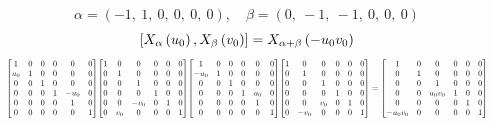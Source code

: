\documentclass[11pt]{article}
\theoremstyle{definition}
\begin{document}
\[
\alpha = \left( -1, \  1, \  0, \  0, \  0, \  0\right), \quad \beta = \left( 0, \  -1, \  -1, \  0, \  0, \  0\right)
\]
\[
\scaletoalign{\textwidth}{\left[ X_{\alpha}\left(u_{0}\right), X_{\beta}\left(v_{0}\right) \right] = X_{\alpha + \beta}\left(- u_{0} v_{0}\right)}
\]
\[
\scaletoalign{\textwidth}{{\left[\begin{matrix}1 & 0 & 0 & 0 & 0 & 0\\u_{0} & 1 & 0 & 0 & 0 & 0\\0 & 0 & 1 & 0 & 0 & 0\\0 & 0 & 0 & 1 & - u_{0} & 0\\0 & 0 & 0 & 0 & 1 & 0\\0 & 0 & 0 & 0 & 0 & 1\end{matrix}\right]} {\left[\begin{matrix}1 & 0 & 0 & 0 & 0 & 0\\0 & 1 & 0 & 0 & 0 & 0\\0 & 0 & 1 & 0 & 0 & 0\\0 & 0 & 0 & 1 & 0 & 0\\0 & 0 & - v_{0} & 0 & 1 & 0\\0 & v_{0} & 0 & 0 & 0 & 1\end{matrix}\right]} {\left[\begin{matrix}1 & 0 & 0 & 0 & 0 & 0\\- u_{0} & 1 & 0 & 0 & 0 & 0\\0 & 0 & 1 & 0 & 0 & 0\\0 & 0 & 0 & 1 & u_{0} & 0\\0 & 0 & 0 & 0 & 1 & 0\\0 & 0 & 0 & 0 & 0 & 1\end{matrix}\right]} {\left[\begin{matrix}1 & 0 & 0 & 0 & 0 & 0\\0 & 1 & 0 & 0 & 0 & 0\\0 & 0 & 1 & 0 & 0 & 0\\0 & 0 & 0 & 1 & 0 & 0\\0 & 0 & v_{0} & 0 & 1 & 0\\0 & - v_{0} & 0 & 0 & 0 & 1\end{matrix}\right]} = {\left[\begin{matrix}1 & 0 & 0 & 0 & 0 & 0\\0 & 1 & 0 & 0 & 0 & 0\\0 & 0 & 1 & 0 & 0 & 0\\0 & 0 & u_{0} v_{0} & 1 & 0 & 0\\0 & 0 & 0 & 0 & 1 & 0\\- u_{0} v_{0} & 0 & 0 & 0 & 0 & 1\end{matrix}\right]}}
\]
\end{document}
